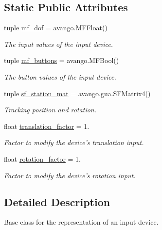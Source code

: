 \subsection*{\-Static \-Public \-Attributes}
\begin{DoxyCompactItemize}
\item 
tuple \hyperlink{classlib_1_1Device_1_1MultiDofDevice_a7fb0542d82d1826e96f65c209a43f2df}{mf\-\_\-dof} = avango.\-M\-F\-Float()
\begin{DoxyCompactList}\small\item\em \-The input values of the input device. \end{DoxyCompactList}\item 
tuple \hyperlink{classlib_1_1Device_1_1MultiDofDevice_a87336be0a2a14f20056c52b7d748d130}{mf\-\_\-buttons} = avango.\-M\-F\-Bool()
\begin{DoxyCompactList}\small\item\em \-The button values of the input device. \end{DoxyCompactList}\item 
tuple \hyperlink{classlib_1_1Device_1_1MultiDofDevice_ab59451f95bf8bf7b806aad6eda1147ba}{sf\-\_\-station\-\_\-mat} = avango.\-gua.\-S\-F\-Matrix4()
\begin{DoxyCompactList}\small\item\em \-Tracking position and rotation. \end{DoxyCompactList}\item 
float \hyperlink{classlib_1_1Device_1_1MultiDofDevice_a92b1c30e0edb14afd629c053d6719594}{translation\-\_\-factor} = 1.
\begin{DoxyCompactList}\small\item\em \-Factor to modify the device's translation input. \end{DoxyCompactList}\item 
float \hyperlink{classlib_1_1Device_1_1MultiDofDevice_a04b79f1c36851426cd8845111d3d7e5f}{rotation\-\_\-factor} = 1.
\begin{DoxyCompactList}\small\item\em \-Factor to modify the device's rotation input. \end{DoxyCompactList}\end{DoxyCompactItemize}


\subsection{\-Detailed \-Description}
\-Base class for the representation of an input device. 

